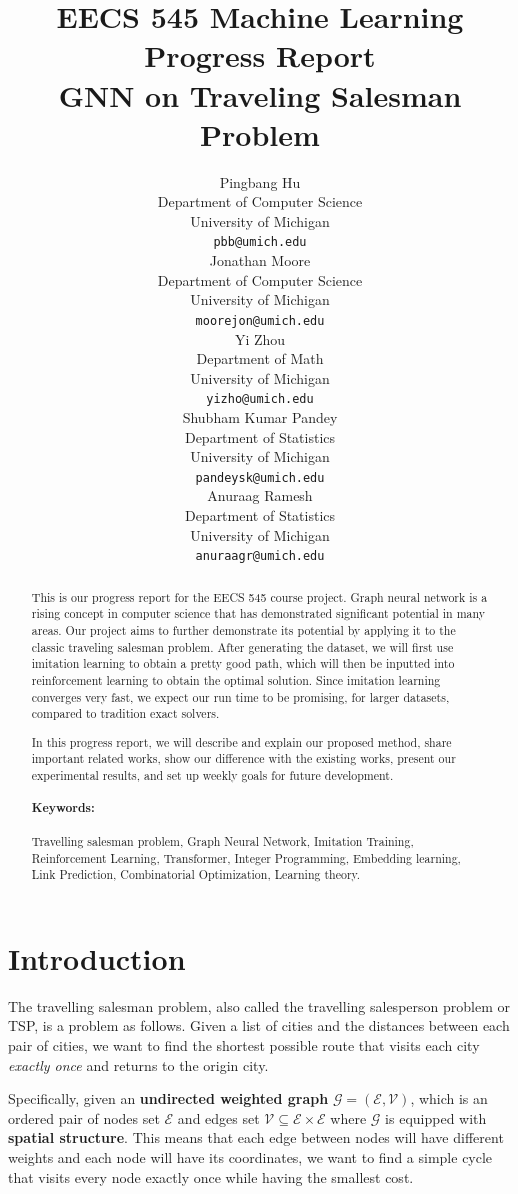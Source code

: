 \documentclass{article}
\title{EECS 545 Machine Learning\\Progress Report\\GNN on Traveling Salesman Problem}
\author{%
  Pingbang Hu\\
  Department of Computer Science\\
  University of Michigan\\
  \texttt{pbb@umich.edu} \\
  \And
  Jonathan Moore \\
  Department of Computer Science\\
  University of Michigan\\
  \texttt{moorejon@umich.edu} \\
  \And
  Yi Zhou \\
  Department of Math\\
  University of Michigan\\
  \texttt{yizho@umich.edu} \\
  \And
  Shubham Kumar Pandey \\
  Department of Statistics\\
  University of Michigan\\
  \texttt{pandeysk@umich.edu} \\
  \And
  Anuraag Ramesh \\
  Department of Statistics\\
  University of Michigan\\
  \texttt{anuraagr@umich.edu} \\
}
\begin{document}
\maketitle

\begin{abstract}

	This is our progress report for the EECS 545 course project. Graph neural network is a rising concept in computer science that has demonstrated significant potential in many areas. Our project aims to
	further demonstrate its potential by applying it to the classic traveling salesman problem. After generating the dataset, we will first use imitation learning to obtain a pretty good path, which will
	then be inputted into reinforcement learning to obtain the optimal solution. Since imitation learning converges very fast, we expect our run time to be promising, for larger datasets, compared to tradition exact solvers.

	In this progress report, we will describe and explain our proposed method, share important related works, show our difference with the existing works, present our experimental results, and set up weekly goals for future development.

	\paragraph{Keywords:} Travelling salesman problem, Graph Neural Network, Imitation Training, Reinforcement Learning, Transformer, Integer Programming, Embedding learning, Link Prediction, Combinatorial
	Optimization, Learning theory.
\end{abstract}


\section{Introduction}

The travelling salesman problem, also called the travelling salesperson problem or TSP, is a problem as follows. Given a list of cities and the distances between each pair of cities, we want
to find the shortest possible route that visits each city \emph{exactly once} and returns to the origin city.

Specifically, given an \textbf{undirected weighted graph} \(\mathcal{G} = (\mathcal{E}, \mathcal{V})\), which is an ordered pair of nodes set \(\mathcal{E}\) and edges set
\(\mathcal{V}\subseteq \mathcal{E}\times\mathcal{E}\) where \(\mathcal{G}\) is equipped with \textbf{spatial structure}. This means that each edge between nodes will have different weights and each
node will have its coordinates, we want to find a simple cycle that visits every node exactly once while having the smallest cost.
\end{document}
